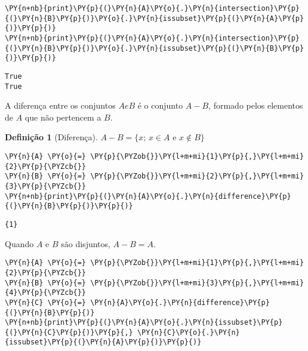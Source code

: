 \documentclass{book}
\newtheorem{definicao}{Definição}[section]
\begin{document}
\begin{Verbatim}[commandchars=\\\{\},frame=single,fontsize=\small, xleftmargin=0.5em]
\PY{n+nb}{print}\PY{p}{(}\PY{n}{A}\PY{o}{.}\PY{n}{intersection}\PY{p}{(}\PY{n}{B}\PY{p}{)}\PY{o}{.}\PY{n}{issubset}\PY{p}{(}\PY{n}{A}\PY{p}{)}\PY{p}{)}
\PY{n+nb}{print}\PY{p}{(}\PY{n}{A}\PY{o}{.}\PY{n}{intersection}\PY{p}{(}\PY{n}{B}\PY{p}{)}\PY{o}{.}\PY{n}{issubset}\PY{p}{(}\PY{n}{B}\PY{p}{)}\PY{p}{)}
\end{Verbatim}

\begin{Verbatim}[commandchars=\\\{\},frame=leftline,fontsize=\small, xleftmargin=0.5em]
True
True
\end{Verbatim}


        A diferença entre os conjuntos $A e B$ é o conjunto $A - B$, formado pelos elementos de $A$ que não pertencem a $B$.

        \begin{definicao}[Diferença]
        $A - B = \{ x \text{; } x \in A \text{ e } x \notin B\}$
        \end{definicao}



\begin{Verbatim}[commandchars=\\\{\},frame=single,fontsize=\small, xleftmargin=0.5em]
\PY{n}{A} \PY{o}{=} \PY{p}{\PYZob{}}\PY{l+m+mi}{1}\PY{p}{,}\PY{l+m+mi}{2}\PY{p}{\PYZcb{}}
\PY{n}{B} \PY{o}{=} \PY{p}{\PYZob{}}\PY{l+m+mi}{2}\PY{p}{,}\PY{l+m+mi}{3}\PY{p}{\PYZcb{}}
\PY{n+nb}{print}\PY{p}{(}\PY{n}{A}\PY{o}{.}\PY{n}{difference}\PY{p}{(}\PY{n}{B}\PY{p}{)}\PY{p}{)}
\end{Verbatim}

\begin{Verbatim}[commandchars=\\\{\},frame=leftline,fontsize=\small, xleftmargin=0.5em]
{1}
\end{Verbatim}


        Quando $A$ e $B$ são disjuntos, $A-B=A$.



\begin{Verbatim}[commandchars=\\\{\},frame=single,fontsize=\small, xleftmargin=0.5em]
\PY{n}{A} \PY{o}{=} \PY{p}{\PYZob{}}\PY{l+m+mi}{1}\PY{p}{,}\PY{l+m+mi}{2}\PY{p}{\PYZcb{}}
\PY{n}{B} \PY{o}{=} \PY{p}{\PYZob{}}\PY{l+m+mi}{3}\PY{p}{,}\PY{l+m+mi}{4}\PY{p}{\PYZcb{}}
\PY{n}{C} \PY{o}{=} \PY{n}{A}\PY{o}{.}\PY{n}{difference}\PY{p}{(}\PY{n}{B}\PY{p}{)}
\PY{n+nb}{print}\PY{p}{(}\PY{n}{A}\PY{o}{.}\PY{n}{issubset}\PY{p}{(}\PY{n}{C}\PY{p}{)}\PY{p}{,} \PY{n}{C}\PY{o}{.}\PY{n}{issubset}\PY{p}{(}\PY{n}{A}\PY{p}{)}\PY{p}{)}
\end{Verbatim}
\end{document}
